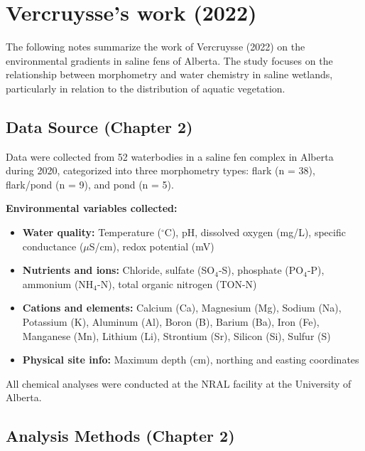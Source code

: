 \section{Vercruysse's work (2022)}
The following notes summarize the work of Vercruysse (2022) on the environmental gradients in saline fens of Alberta.
 The study focuses on the relationship between morphometry and water chemistry in saline wetlands, 
 particularly in relation to the distribution of aquatic vegetation.

\subsection{Data Source (Chapter 2)}
Data were collected from 52 waterbodies in a saline fen complex in Alberta during 2020, categorized into three morphometry types: flark (n = 38), flark/pond (n = 9), and pond (n = 5).

\textbf{Environmental variables collected:}
\begin{itemize}
  \item \textbf{Water quality:} Temperature ($^\circ$C), pH, dissolved oxygen (mg/L), specific conductance ($\mu$S/cm), redox potential (mV)
  \item \textbf{Nutrients and ions:} Chloride, sulfate (SO$_4$-S), phosphate (PO$_4$-P), ammonium (NH$_4$-N), total organic nitrogen (TON-N)
  \item \textbf{Cations and elements:} Calcium (Ca), Magnesium (Mg), Sodium (Na), Potassium (K), Aluminum (Al), Boron (B), Barium (Ba), Iron (Fe), Manganese (Mn), Lithium (Li), Strontium (Sr), Silicon (Si), Sulfur (S)
  \item \textbf{Physical site info:} Maximum depth (cm), northing and easting coordinates
\end{itemize}

All chemical analyses were conducted at the NRAL facility at the University of Alberta.

\subsection{Analysis Methods (Chapter 2)}

